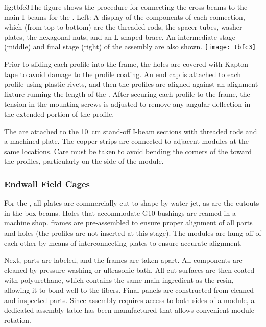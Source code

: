 \begin{dunefigure}{fig:tbfc3}{The figure shows the procedure for connecting the cross beams to the main I-beams for the . Left: A display of the components of each connection, which (from top to bottom) are the threaded rods, the spacer tubes, washer plates, the hexagonal nuts, and an L-shaped  brace. An intermediate stage (middle) and final stage (right) of the assembly are also shown.}
\texttt{[image: tbfc3]}
\end{dunefigure}

Prior to sliding each profile into the  frame, the holes %
are covered with Kapton tape to avoid damage to the profile coating. An end cap is attached to each profile using plastic rivets, and then the profiles are aligned against an alignment fixture running the length of the . After securing each profile to the frame, the tension in the mounting screws is adjusted to remove any angular deflection in the extended portion of the profile.

The  are attached to the \SI{10}{\cm} stand-off I-beam sections with threaded rods and a machined plate. The copper strips are connected to adjacent modules at the same locations. Care must be taken to avoid bending the corners of the  toward the profiles, particularly on the  side of the module.

\subsubsection{Endwall Field Cages}
\label{sec:fdsp-hv-prod-fc-endw}

For the , all  plates are commercially cut to shape by water jet, as are the cutouts in the  box beams. %
Holes that accommodate G10 bushings are reamed in a machine shop.  frames are pre-assembled to ensure proper alignment of all  parts and %
holes (the profiles are not inserted at this stage). The  modules are hung off of each other by means of interconnecting  plates to ensure accurate alignment.

Next, parts are labeled, and the frames are taken apart. All components are cleaned by pressure washing or ultrasonic bath. All cut  surfaces are then coated with polyurethane, which contains the same main ingredient as the  resin, allowing it to bond well to the  fibers. Final panels are constructed from cleaned and inspected parts. Since assembly requires access to both sides of a module,
a dedicated assembly table has been manufactured that allows convenient module rotation. 

